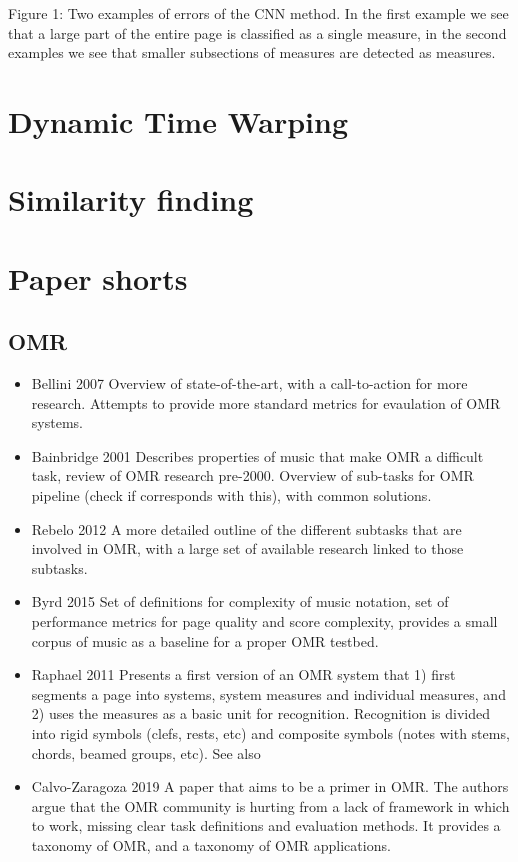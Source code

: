 Figure 1: Two examples of errors of the CNN method. In the first example we see that a large part of the entire page is classified as a single measure, in the second examples we see that smaller subsections of measures are detected as measures.

\section{Dynamic Time Warping}

\section{Similarity finding}

\section{Paper shorts}

\subsection{OMR}
\begin{itemize}
    \item Bellini 2007 \citep{Bellini2007} Overview of state-of-the-art, with a call-to-action for more research. Attempts to provide more standard metrics for evaulation of OMR systems.
    \item Bainbridge 2001 \citep{Bainbridge2001} Describes properties of music that make OMR a difficult task, review of OMR research pre-2000. Overview of sub-tasks for OMR pipeline (check if \citep{Rebelo2012} corresponds with this), with common solutions.
    \item Rebelo 2012\citep{Rebelo2012} A more detailed outline of the different subtasks that are involved in OMR, with a large set of available research linked to those subtasks. \citep{}
    \item Byrd 2015 \citep{Byrd2015} Set of definitions for complexity of music notation, set of performance metrics for page quality and score complexity, provides a small corpus of music as a baseline for a proper OMR testbed. 
    \item Raphael 2011 \citep{Raphael2011} Presents a first version of an OMR system that 1) first segments a page into systems, system measures and individual measures, and 2) uses the measures as a basic unit for recognition. Recognition is divided into rigid symbols (clefs, rests, etc) and composite symbols (notes with stems, chords, beamed groups, etc). See also \citep{Chen2016}
   \item Calvo-Zaragoza 2019 \citep{CalvoZaragoza2019} A paper that aims to be a primer in OMR. The authors argue that the OMR community is hurting from a lack of framework in which to work, missing clear task definitions and evaluation methods. It provides a taxonomy of OMR, and a taxonomy of OMR applications.
\end{itemize}

